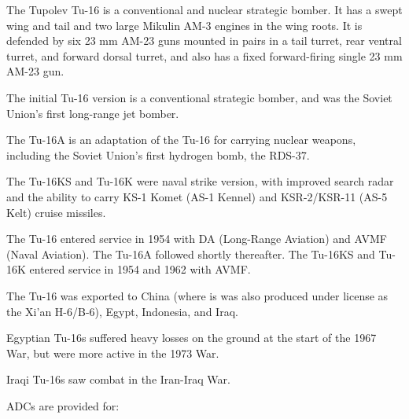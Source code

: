 
The Tupolev Tu-16 is a conventional and nuclear strategic bomber. It has a swept wing and tail and two large Mikulin AM-3 engines in the wing roots. It is defended by six 23 mm AM-23 guns mounted in pairs in a tail turret, rear ventral turret, and forward dorsal turret, and also has a fixed forward-firing single 23 mm AM-23 gun.

The initial Tu-16 version is a conventional strategic bomber, and was the Soviet Union's first long-range jet bomber.

The Tu-16A is an adaptation of the Tu-16 for carrying nuclear weapons, including the Soviet Union's first hydrogen bomb, the RDS-37.

The Tu-16KS and Tu-16K were naval strike version, with improved search radar and the ability to carry KS-1 Komet (AS-1 Kennel) and KSR-2/KSR-11 (AS-5 Kelt) cruise missiles.

The Tu-16 entered service in 1954 with DA (Long-Range Aviation) and AVMF (Naval Aviation). The Tu-16A followed shortly thereafter. The Tu-16KS and Tu-16K entered service in 1954 and 1962 with AVMF.

The Tu-16 was exported to China (where is was also produced under license as the Xi'an H-6/B-6), Egypt, Indonesia, and Iraq.

Egyptian Tu-16s suffered heavy losses on the ground at the start of the 1967 War, but were more active in the 1973 War.

Iraqi Tu-16s saw combat in the Iran-Iraq War.

ADCs are provided for:
\begin{adclist}
\end{adclist}